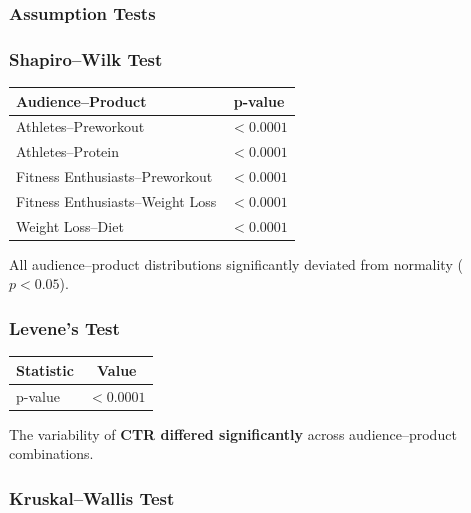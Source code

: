 \subsubsection{Assumption Tests}

\subsubsection{Shapiro--Wilk Test}

\begin{table}[H]
	\centering
	\begin{tabular}{lc}
		\toprule
		Audience--Product & p-value \\
		\midrule
		Athletes--Preworkout & $<0.0001$ \\
		Athletes--Protein & $<0.0001$ \\
		Fitness Enthusiasts--Preworkout & $<0.0001$ \\
		Fitness Enthusiasts--Weight Loss & $<0.0001$ \\
		Weight Loss--Diet & $<0.0001$ \\
		\bottomrule
	\end{tabular}
\end{table}

All audience--product distributions significantly deviated from normality ($p<0.05$).

\vspace{0.3cm}

\subsubsection{Levene's Test}

\begin{table}[H]
	\centering
	\begin{tabular}{lc}
		\toprule
		Statistic & Value \\
		\midrule
		p-value & $<0.0001$ \\
		\bottomrule
	\end{tabular}
\end{table}

The variability of \textbf{CTR differed significantly} across audience--product combinations.

\vspace{0.3cm}

\subsubsection{Kruskal--Wallis Test}

